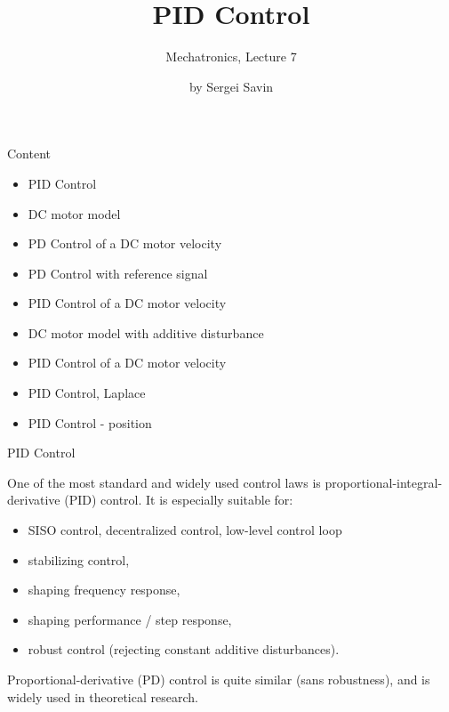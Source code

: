 \documentclass{beamer}
\title{PID Control}
\subtitle{Mechatronics, Lecture 7}
\author{by Sergei Savin}
\date{\mydate}
\begin{document}
\maketitle



\begin{frame}{Content}
\begin{itemize}
\item PID Control
\item DC motor model
\item PD Control of a DC motor velocity
\item PD Control with reference signal
\item PID Control of a DC motor velocity
\item DC motor model with additive disturbance
\item PID Control of a DC motor velocity
\item PID Control, Laplace
\item PID Control - position
\end{itemize}
\end{frame}




\begin{frame}{PID Control}
	\begin{flushleft}
		
		One of the most standard and widely used control laws is proportional-integral-derivative (PID) control. It is especially suitable for:
		
		\begin{itemize}
			\item SISO control, decentralized control, low-level control loop
			\item stabilizing control,
			\item shaping frequency response,
			\item shaping performance / step response,
			\item robust control (rejecting constant additive disturbances).
		\end{itemize}
		
		Proportional-derivative (PD) control is quite similar (sans robustness), and is widely used in theoretical research.
		
	\end{flushleft}
\end{frame}
\end{document}
